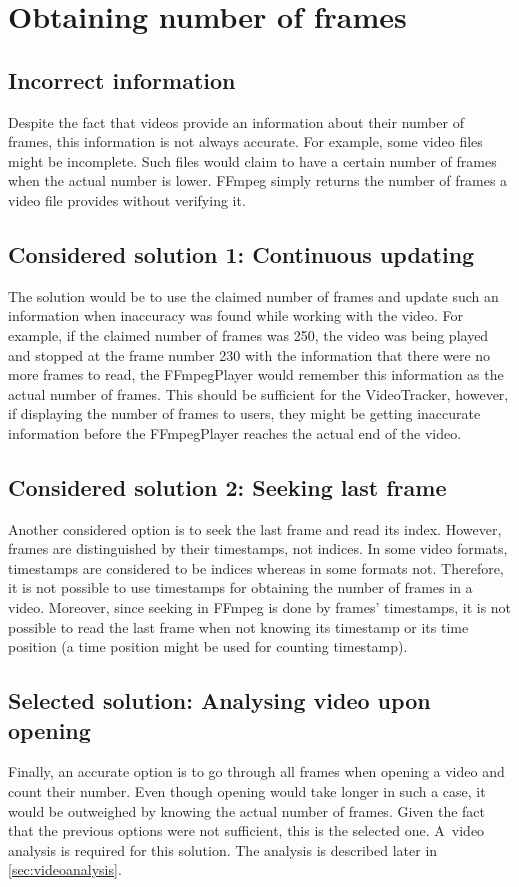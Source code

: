 \section{Obtaining number of frames}\label{sec:numframes}
\subsection{Incorrect information}
Despite the fact that videos provide an information about their number of frames, this information is not always accurate. For example, some video files might be incomplete. Such files would claim to have a certain number of frames when the actual number is lower. FFmpeg simply returns the number of frames a video file provides without verifying it.

\subsection{Considered solution 1: Continuous updating}
The solution would be to use the claimed number of frames and update such an information when inaccuracy was found while working with the video. For example, if the claimed number of frames was 250, the video was being played and stopped at the frame number 230 with the information that there were no more frames to read, the FFmpegPlayer would remember this information as the actual number of frames. This should be sufficient for the VideoTracker, however, if displaying the number of frames to users, they might be getting inaccurate information before the FFmpegPlayer reaches the actual end of the video.

\subsection{Considered solution 2: Seeking last frame}
Another considered option is to seek the last frame and read its index. However, frames are distinguished by their timestamps, not indices. In some video formats, timestamps are considered to be indices whereas in some formats not. Therefore, it is not possible to use timestamps for obtaining the number of frames in a video. Moreover, since seeking in FFmpeg is done by frames’ timestamps, it is not possible to read the last frame when not knowing its timestamp or its time position (a time position might be used for counting timestamp).

\subsection{Selected solution: Analysing video upon opening}
Finally, an accurate option is to go through all frames when opening a video and count their number. Even though opening would take longer in such a case, it would be outweighed by knowing the actual number of frames. Given the fact that the previous options were not sufficient, this is the selected one. A~video analysis is required for this solution. The analysis is described later in \autoref{sec:videoanalysis}.


